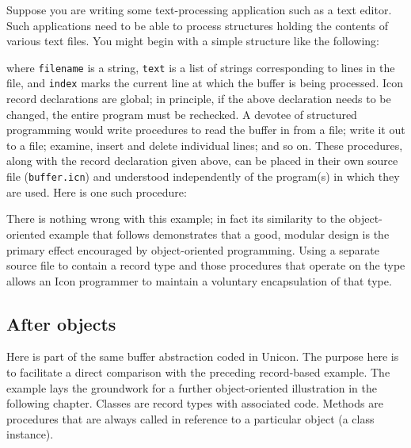 Suppose you are writing some text-processing application such as a text
editor. Such applications need to be able to process
structures holding the contents of various text files. You might begin
with a simple structure like the following:


\noindent
where \texttt{filename} is a string, \texttt{text} is a list of strings
corresponding to lines in the file, and \texttt{index} marks
the current line at which the buffer is being processed. Icon record
declarations are global; in principle, if the above declaration needs
to be changed, the entire program must be rechecked. A devotee of
structured programming would write procedures to read the buffer
in from a file; write it out to a file; examine, insert and delete
individual lines; and so on. These procedures, along with the record
declaration given above, can be placed in their own source file
(\texttt{buffer.icn}) and understood independently of the program(s) in
which they are used. Here is one such procedure:


There is nothing wrong with this example; in fact its similarity to the
object-oriented example that follows demonstrates that a good, modular
design is the primary effect encouraged by object-oriented programming. Using a separate source file
to contain a record type and those procedures that operate on the type
allows an Icon programmer to maintain a voluntary encapsulation of that
type.

\subsection*{After objects}

Here is part of the same buffer abstraction coded in Unicon. The
purpose here is to facilitate a direct comparison with the preceding
record-based example. The example lays the groundwork for a
further object-oriented illustration in the following
chapter. Classes are record types with associated code.
Methods are procedures that are always called in
reference to a particular object (a class instance).

